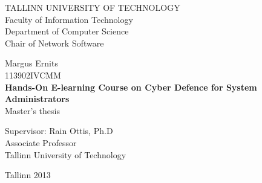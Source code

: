 \begin{titlepage}
	\begingroup
		\singlespace
		\begin{center}
			TALLINN UNIVERSITY OF TECHNOLOGY \\
			Faculty of Information Technology \\
			Department of Computer Science \\
			Chair of Network Software
		
			\vfill
				Margus Ernits \\
				113902IVCMM \\[1.5cm]
				\LARGE \textbf{Hands-On E-learning Course on Cyber Defence for System Administrators} \\[1cm]
				\normalsize Master's thesis \\[4cm]

				\begin{flushright}
					Supervisor: Rain Ottis, Ph.D \\
					Associate Professor \\
					Tallinn University of Technology
					
				\end{flushright}
			\vfill

			Tallinn 2013
		\end{center}
	\endgroup
\end{titlepage}